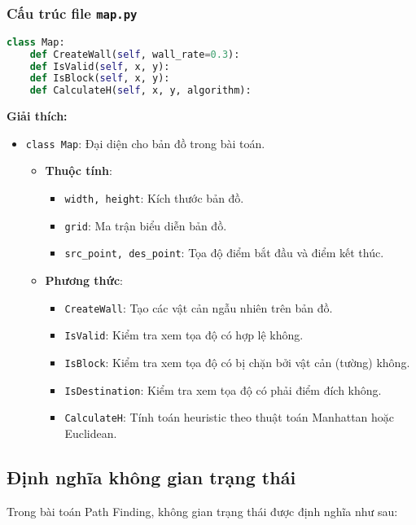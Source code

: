 \subsubsection{Cấu trúc file \texttt{map.py}}
\begin{lstlisting}[language=python, caption=Định nghĩa các lớp trong file map.py]
class Map:
    def CreateWall(self, wall_rate=0.3):
    def IsValid(self, x, y):
    def IsBlock(self, x, y):
    def CalculateH(self, x, y, algorithm):
\end{lstlisting}

\textbf{Giải thích:}
\begin{itemize}
    \item \texttt{class Map}: Đại diện cho bản đồ trong bài toán.
    \begin{itemize}
        \item \textbf{Thuộc tính}:
        \begin{itemize}
            \item \texttt{width, height}: Kích thước bản đồ.
            \item \texttt{grid}: Ma trận biểu diễn bản đồ.
            \item \texttt{src\_point, des\_point}: Tọa độ điểm bắt đầu và điểm kết thúc.
        \end{itemize}
        \item \textbf{Phương thức}:
        \begin{itemize}
            \item \texttt{CreateWall}: Tạo các vật cản ngẫu nhiên trên bản đồ.
            \item \texttt{IsValid}: Kiểm tra xem tọa độ có hợp lệ không.
            \item \texttt{IsBlock}: Kiểm tra xem tọa độ có bị chặn bởi vật cản (tường) không.
            \item \texttt{IsDestination}: Kiểm tra xem tọa độ có phải điểm đích không.
            \item \texttt{CalculateH}: Tính toán heuristic theo thuật toán Manhattan hoặc Euclidean.
        \end{itemize}
    \end{itemize}
\end{itemize}
\subsection{Định nghĩa không gian trạng thái}

Trong bài toán Path Finding, không gian trạng thái được định nghĩa như sau:

